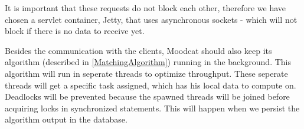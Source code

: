 \par
It is important that these requests do not block each other, therefore we have chosen a servlet container, Jetty, that uses asynchronous sockets - which will not block if there is no data to receive yet.

\par
Besides the communication with the clients, Moodcat should also keep its algorithm (described in \ref{MatchingAlgorithm}) running in the background.
This algorithm will run in seperate threads to optimize throughput.
These seperate threads will get a specific task assigned, which has his local data to compute on.
Deadlocks will be prevented because the spawned threads will be joined before acquiring locks in synchronized statements.
This will happen when we persist the algorithm output in the database.
